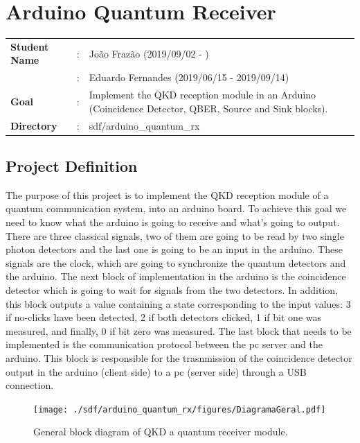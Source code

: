 \clearpage
\section{Arduino Quantum Receiver}

\begin{refsection}
	
	\begin{tcolorbox}	
		\begin{tabular}{p{2.75cm} p{0.2cm} p{10.5cm}} 	
			\textbf{Student Name}  		&:&  Jo\~ao Fraz\~ao (2019/09/02 - )\\
			&:&  Eduardo Fernandes (2019/06/15 - 2019/09/14)\\
			\textbf{Goal}          &:& Implement the QKD reception module in an Arduino (Coincidence Detector, QBER, Source and Sink blocks).\\
			\textbf{Directory}              &:& sdf/arduino\_quantum\_rx
		\end{tabular}
	\end{tcolorbox}
	
	
	\subsection{Project Definition}
	
		The purpose of this project is to implement the QKD reception module of a quantum communication system, into an arduino board. To achieve this goal we need to know what the arduino is going to receive and what's going to output.
		There are three classical signals, two of them are going to be read by two single photon detectors and the last one is going to be an input in the arduino. These signals are the clock, which are going to synchronize the quantum detectors and the arduino. The next block of implementation in the arduino is the coincidence detector which is going to wait for signals from the two detectors. In addition, this block outputs a value containing a state corresponding to the input values: 3 if no-clicks have been detected, 2 if both detectors clicked, 1 if bit one was measured, and finally, 0 if bit zero was measured. The last block that needs to be implemented is the communication protocol between the pc server and the arduino. This block is responsible for the trasnmission of the coincidence detector output in the arduino (client side) to a pc (server side) through a USB connection.  
		
	\begin{figure}[H]
		\centering
		\texttt{[image: ./sdf/arduino\_quantum\_rx/figures/DiagramaGeral.pdf]}
		\caption{General block diagram of QKD a quantum receiver module.}
		\label{fig:arduino}
		

\end{figure}
\end{refsection}
